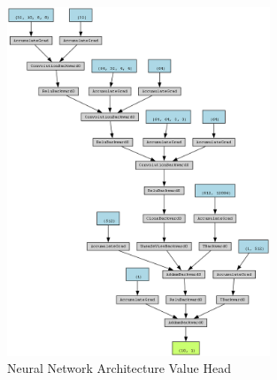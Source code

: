 \begin{figure}
    \centering
    \includegraphics[width=0.7\textwidth]{Bilder/value_graph.png}
    \caption{Neural Network Architecture Value Head}
    \label{fig:value_graph}
\end{figure}


